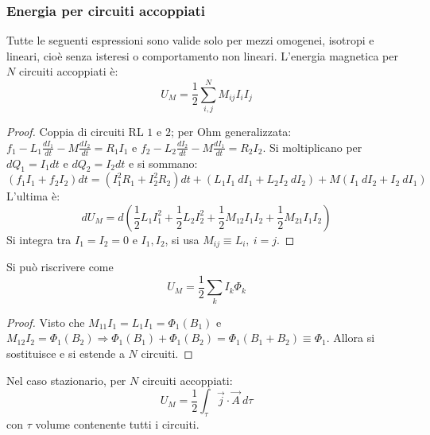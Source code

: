 \documentclass[10pt, a4paper]{scrartcl}
\numberwithin{equation}{subsection}
\theoremstyle{style1}
\newenvironment{boxenv}[1][]{
    \begin{eqbox}[#1]
    }{
   \end{eqbox}
}
\begin{document}
\subsubsection{Energia per circuiti accoppiati}
Tutte le seguenti espressioni sono valide solo per mezzi omogenei, isotropi e lineari, cio\`e senza isteresi o comportamento non lineari. L'energia magnetica per $N$ circuiti accoppiati \`e:
\begin{equation}
	U_M = \frac{1}{2}\sum_{i,j}^{N} M_{ij} I_i I_j
\end{equation}
\begin{boxenv}[]
\begin{proof}
	Coppia di circuiti RL $1$ e $2$; per Ohm generalizzata: $f_1 - L_1 \frac{d I_1}{d t} - M \frac{d I_2}{d t} = R_1 I_1$ e $f_2-L_2 \frac{d I_2}{d t}  - M \frac{d I_1}{d t} = R_2I_2$. Si moltiplicano per $dQ_1 = I_1dt$ e $dQ_2 = I_2dt$ e si sommano:
		\[
			(f_1I_1+f_2I_2) dt = (I_1^2 R_1 + I_2^2R_2) dt + (L_1I_1 \ dI_1 + L_2I_2\ dI_2) + M (I_1\ dI_2+I_2\ dI_1)
		\] 
		 L'ultima \`e:
		\begin{equation}
			dU_M = d \left(\frac{1}{2}L_1I_1^2 + \frac{1}{2}L_2I_2^2 + \frac{1}{2}M_{12}I_1I_2 + \frac{1}{2}M_{21}I_1I_2\right) 
		\end{equation}
		Si integra tra $I_1=I_2=0$ e $I_1,I_2$, si usa $M_{ij} \equiv L_i, \ i=j$.
	\end{proof}
\end{boxenv}
\noindent Si pu\`o riscrivere come
\begin{equation}
	U_M = \frac{1}{2}\sum_{k}^{} I_k\Phi_k
\end{equation}
\begin{boxenv}[]
\begin{proof}
	Visto che $M_{11}I_1=L_1I_1=\Phi_1(B_1)$ e $M_{12}I_2=\Phi_1(B_2)\Rightarrow \Phi_1(B_1)+\Phi_1(B_2) = \Phi_1(B_1+B_2)\equiv \Phi_1$. Allora si sostituisce e si estende a $N$ circuiti.
\end{proof}
\end{boxenv}
\noindent Nel caso stazionario, per $N$ circuiti accoppiati:
\begin{equation}
	U_M = \frac{1}{2} \int_{\tau } \vec{j}\cdot \vec{A}\ d\tau 
\end{equation}
con $\tau $ volume contenente tutti i circuiti.
\end{document}
